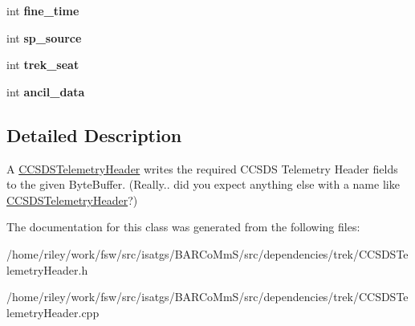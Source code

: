\begin{DoxyCompactItemize}
\item 
int {\bfseries fine\+\_\+time}\hypertarget{classisat__trek_1_1_c_c_s_d_s_telemetry_header_ab08fca8bacf5b8345a8dc927742de6a0}{}\label{classisat__trek_1_1_c_c_s_d_s_telemetry_header_ab08fca8bacf5b8345a8dc927742de6a0}

\item 
int {\bfseries sp\+\_\+source}\hypertarget{classisat__trek_1_1_c_c_s_d_s_telemetry_header_a8763710bdfb7e74a88025b12425e96f7}{}\label{classisat__trek_1_1_c_c_s_d_s_telemetry_header_a8763710bdfb7e74a88025b12425e96f7}

\item 
int {\bfseries trek\+\_\+seat}\hypertarget{classisat__trek_1_1_c_c_s_d_s_telemetry_header_a0993ceeaf9294fe285fa652cf962176e}{}\label{classisat__trek_1_1_c_c_s_d_s_telemetry_header_a0993ceeaf9294fe285fa652cf962176e}

\item 
int {\bfseries ancil\+\_\+data}\hypertarget{classisat__trek_1_1_c_c_s_d_s_telemetry_header_a3b9a8781ba758fd1795afbb2a97b24ad}{}\label{classisat__trek_1_1_c_c_s_d_s_telemetry_header_a3b9a8781ba758fd1795afbb2a97b24ad}

\end{DoxyCompactItemize}


\subsection{Detailed Description}
A \hyperlink{classisat__trek_1_1_c_c_s_d_s_telemetry_header}{C\+C\+S\+D\+S\+Telemetry\+Header} writes the required C\+C\+S\+DS Telemetry Header fields to the given Byte\+Buffer. (Really.. did you expect anything else with a name like \hyperlink{classisat__trek_1_1_c_c_s_d_s_telemetry_header}{C\+C\+S\+D\+S\+Telemetry\+Header}?) 

The documentation for this class was generated from the following files\+:\begin{DoxyCompactItemize}
\item 
/home/riley/work/fsw/src/isatgs/\+B\+A\+R\+Co\+Mm\+S/src/dependencies/trek/C\+C\+S\+D\+S\+Telemetry\+Header.\+h\item 
/home/riley/work/fsw/src/isatgs/\+B\+A\+R\+Co\+Mm\+S/src/dependencies/trek/C\+C\+S\+D\+S\+Telemetry\+Header.\+cpp\end{DoxyCompactItemize}
